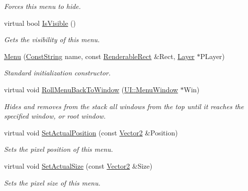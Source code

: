 \begin{DoxyCompactItemize}
\begin{DoxyCompactList}\small\item\em Forces this menu to hide. \item\end{DoxyCompactList}\item 
virtual bool \hyperlink{classphys_1_1UI_1_1Menu_ae23321617d7e14448e2fab3b455c3dc7}{IsVisible} ()
\begin{DoxyCompactList}\small\item\em Gets the visibility of this menu. \item\end{DoxyCompactList}\item 
\hyperlink{classphys_1_1UI_1_1Menu_abe99c5c7a18947dde5d3f44ce6fa0727}{Menu} (\hyperlink{namespacephys_a5ce5049f8b4bf88d6413c47b504ebb31}{ConstString} name, const \hyperlink{structphys_1_1UI_1_1RenderableRect}{RenderableRect} \&Rect, \hyperlink{classphys_1_1UI_1_1Layer}{Layer} $\ast$PLayer)
\begin{DoxyCompactList}\small\item\em Standard initialization constructor. \item\end{DoxyCompactList}\item 
virtual void \hyperlink{classphys_1_1UI_1_1Menu_a7eb3efc2675bf281a829f69416b46327}{RollMenuBackToWindow} (\hyperlink{classphys_1_1UI_1_1MenuWindow}{UI::MenuWindow} $\ast$Win)
\begin{DoxyCompactList}\small\item\em Hides and removes from the stack all windows from the top until it reaches the specified window, or root window. \item\end{DoxyCompactList}\item 
virtual void \hyperlink{classphys_1_1UI_1_1Menu_a1d5434382755df214b169d3e9901c1e1}{SetActualPosition} (const \hyperlink{classphys_1_1Vector2}{Vector2} \&Position)
\begin{DoxyCompactList}\small\item\em Sets the pixel position of this menu. \item\end{DoxyCompactList}\item 
virtual void \hyperlink{classphys_1_1UI_1_1Menu_acc3fb39539fd3c13def35be54570ae81}{SetActualSize} (const \hyperlink{classphys_1_1Vector2}{Vector2} \&Size)
\begin{DoxyCompactList}\small\item\em Sets the pixel size of this menu. \item\end{DoxyCompactList}\item 

\end{DoxyCompactItemize}
